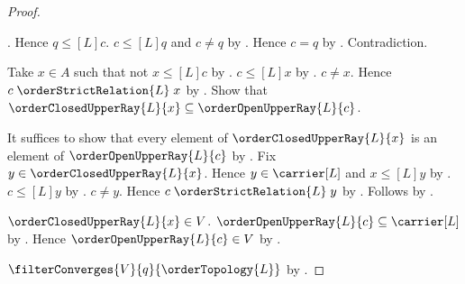 \begin{proof}
\begin{subproof}
\begin{byCase}
\begin{subproof}
                    .
                Hence $q\mathrel{\leq[L]}c$.
                $c\mathrel{\leq[L]}q$ and $c\neq q$ by
                    .
                Hence $c=q$ by
                    .
                Contradiction.
            \end{subproof}
            Take $x\in A$ such that not $x\mathrel{\leq[L]}c$ by
                \auto.
            $c\mathrel{\leq[L]}x$ by
                .
            $c\neq x$.
            Hence $c\mathrel{\orderStrictRelation{L}}x$ by
                .
            Show that $\orderClosedUpperRay{L}{x}
                \subseteq\orderOpenUpperRay{L}{c}$.
            \begin{subproof}
                It suffices to show that every element of
                    $\orderClosedUpperRay{L}{x}$ is an element of
                    $\orderOpenUpperRay{L}{c}$ by .
                Fix $y\in\orderClosedUpperRay{L}{x}$.
                Hence $y\in\carrier[L]$ and
                    $x\mathrel{\leq[L]}y$ by
                    .
                $c\mathrel{\leq[L]}y$ by
                    .
                $c\neq y$.
                Hence $c\mathrel{\orderStrictRelation{L}}y$ by
                    .
                Follows by .
            \end{subproof}
            $\orderClosedUpperRay{L}{x}\in V$.
            $\orderOpenUpperRay{L}{c}\subseteq\carrier[L]$ by
                .
            Hence $\orderOpenUpperRay{L}{c}\in V$ by .
        \end{byCase}
    \end{subproof}
    $\filterConverges{V}{q}{\orderTopology{L}}$ by
        .
\end{proof}

